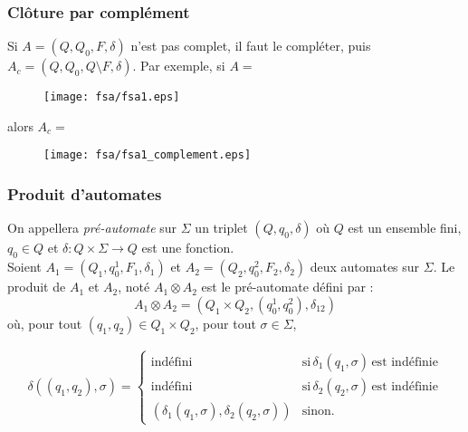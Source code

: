 \documentclass[a4paper]{article}
\begin{document}
  \subsubsection{Clôture par complément}
  Si $A = (Q, Q_0, F, \delta)$ n'est pas complet, il faut le compléter, puis
  $A_c = (Q, Q_0, Q \setminus F, \delta)$. Par exemple, si $A = $

  \begin{figure}[H]
    \begin{center}
      \texttt{[image: fsa/fsa1.eps]}
    \end{center}
  \end{figure}

  alors $A_c =$

  \begin{figure}[H]
    \begin{center}
      \texttt{[image: fsa/fsa1\_complement.eps]}
    \end{center}
  \end{figure}

  \subsubsection{Produit d'automates}
  On appellera \textit{pré-automate} sur $\Sigma$ un triplet $(Q, q_0, \delta)$
  où $Q$ est un ensemble fini, $q_0 \in Q$ et $\delta : Q \times \Sigma \rightarrow Q$
  est une fonction.\\

  Soient $A_1 = (Q_1, q_0^1, F_1, \delta_1)$ et $A_2 = (Q_2, q_0^2, F_2, \delta_2)$
  deux automates sur $\Sigma$. Le produit de $A_1$ et $A_2$, noté $A_1 \otimes A_2$
  est le pré-automate défini par : 
  $$ A_1 \otimes A_2 = (Q_1 \times Q_2, (q_0^1, q_0^2), \delta_{12})$$
  où, pour tout $(q_1, q_2) \in Q_1 \times Q_2$, pour tout $\sigma \in \Sigma$,

  \begin{center} 
    \begin{align*} 
     \delta((q_1, q_2), \sigma) = 
      \begin{cases}
        \text{indéfini} & \text{si}\, \delta_1(q_1, \sigma)\, \text{est indéfinie}\\
        \text{indéfini} & \text{si}\, \delta_2(q_2, \sigma)\, \text{est indéfinie}\\
        (\delta_1(q_1, \sigma), \delta_2(q_2, \sigma)) & \text{sinon}.
      \end{cases} 
    \end{align*} 
  \end{center} 
\end{document}
